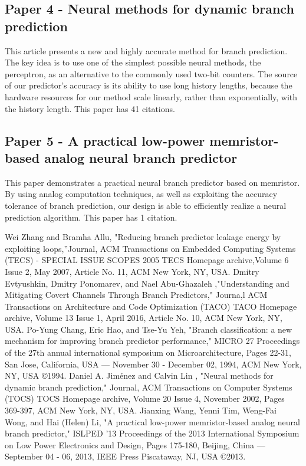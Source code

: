\documentclass[conference]{IEEEtran}
\begin{document}
\subsection{Paper 4 - Neural methods for dynamic branch prediction}

This article presents \cite{b4} a new and highly accurate method for branch prediction. The key idea is to use one of the simplest possible neural methods, the perceptron, as an alternative to the commonly used two-bit counters. The source of our predictor's accuracy is its ability to use long history lengths, because the hardware resources for our method scale linearly, rather than exponentially, with the history length. This paper has 41 citations.

\subsection{Paper 5 - A practical low-power memristor-based analog neural branch predictor}

This paper \cite{b5} demonstrates a practical neural branch predictor based on memristor. By using analog computation techniques, as well as exploiting the accuracy tolerance of branch prediction, our design is able to efficiently realize a neural prediction algorithm. This paper has 1 citation.


\begin{thebibliography}{00}
Wei Zhang and Bramha Allu, "Reducing branch predictor leakage energy by exploiting loops,''Journal, ACM Transactions on Embedded Computing Systems (TECS) - SPECIAL ISSUE SCOPES 2005 TECS Homepage archive,Volume 6 Issue 2, May 2007, Article No. 11, ACM New York, NY, USA.               
 Dmitry Evtyushkin, Dmitry Ponomarev, and Nael Abu-Ghazaleh ,"Understanding and Mitigating Covert Channels Through Branch Predictors," Journa,l ACM Transactions on Architecture and Code Optimization (TACO) TACO Homepage archive,  Volume 13 Issue 1, April 2016,  Article No. 10, ACM New York, NY, USA.
Po-Yung Chang, Eric Hao, and  Tse-Yu Yeh, "Branch classification: a new mechanism for improving branch predictor performance," MICRO 27 Proceedings of the 27th annual international symposium on Microarchitecture, Pages 22-31, San Jose, California, USA — November 30 - December 02, 1994, ACM New York, NY, USA ©1994.
Daniel A. Jiménez and Calvin Lin , "Neural methods for dynamic branch prediction," Journal, ACM Transactions on Computer Systems (TOCS) TOCS Homepage archive, Volume 20 Issue 4, November 2002,  Pages 369-397, ACM New York, NY, USA. 
Jianxing Wang, Yenni Tim, Weng-Fai Wong, and  Hai (Helen) Li, "A practical low-power memristor-based analog neural branch predictor," ISLPED '13 Proceedings of the 2013 International Symposium on Low Power Electronics and Design,  Pages 175-180, Beijing, China — September 04 - 06, 2013, IEEE Press Piscataway, NJ, USA ©2013. 
\end{thebibliography}
\end{document}
